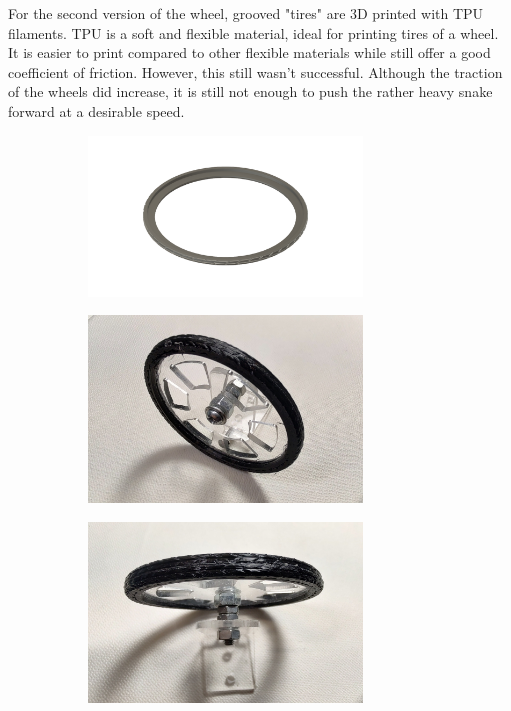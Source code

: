 \documentclass[twoside, 11pt]{article}
\begin{document}
For the second version of the wheel, grooved "tires" are 3D printed with TPU filaments. TPU is a soft and flexible material, ideal for printing tires of a wheel. It is easier to print compared to other flexible materials while still offer a good coefficient of friction. However, this still wasn't successful. Although the traction of the wheels did increase, it is still not enough to push the rather heavy snake forward at a desirable speed. 

\begin{figure} [H]
\centering
	\begin{subfigure}[b]{0.33\linewidth}
		\centering		
		\includegraphics[width=0.8\textwidth]{half_tire_cad}
	\end{subfigure}%
	\begin{subfigure}[b]{0.33\linewidth}
		\centering
		\includegraphics[width=0.8\textwidth]{wheel2side}
		\subcaption{}
	\end{subfigure}%
	\begin{subfigure}[b]{0.33\linewidth}
		\centering		
		\includegraphics[width=0.8\textwidth]{wheel2top}

\end{subfigure}
\end{figure}
\end{document}
